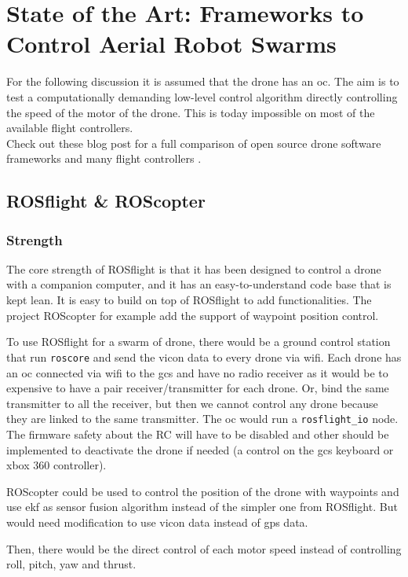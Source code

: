 \chapter{State of the Art: Frameworks to Control Aerial Robot Swarms}

For the following discussion it is assumed that the drone has an \gls{oc}.
The aim is to test a computationally demanding low-level control algorithm directly controlling the speed of the motor of the drone. This is today impossible on most of the available flight controllers.\\
Check out these blog post for a full comparison of open source drone software frameworks \cite{drone_software_projects} and many flight controllers \cite{drone_flight_controllers}.
\section{ROSflight \& ROScopter}
\subsection{Strength}
The core strength of ROSflight is that it has been designed to control a drone with a companion computer, and it has an easy-to-understand code base that is kept lean.
It is easy to build on top of ROSflight to add functionalities. The project ROScopter \cite{github_roscopter} for example add the support of waypoint position control.

To use ROSflight for a swarm of drone, there would be a ground control station that run \texttt{roscore} and send the vicon data to every drone via wifi.
Each drone has an \gls{oc} connected via wifi to the \acrlong{gcs} and have no radio receiver as it would be to expensive to have a pair receiver/transmitter for each drone. Or, bind the same transmitter to all the receiver, but then we cannot control any drone because they are linked to the same transmitter.
The \gls{oc} would run a \texttt{rosflight\_io} node.
The firmware safety about the RC will have to be disabled and other should be implemented to deactivate the drone if needed (a control on the \gls{gcs} keyboard or xbox 360 controller).

ROScopter could be used to control the position of the drone with waypoints and use \gls{ekf} as sensor fusion algorithm instead of the simpler one from ROSflight. But would need modification to use vicon data instead of gps data.

Then, there would be the direct control of each motor speed instead of controlling roll, pitch, yaw and thrust.

